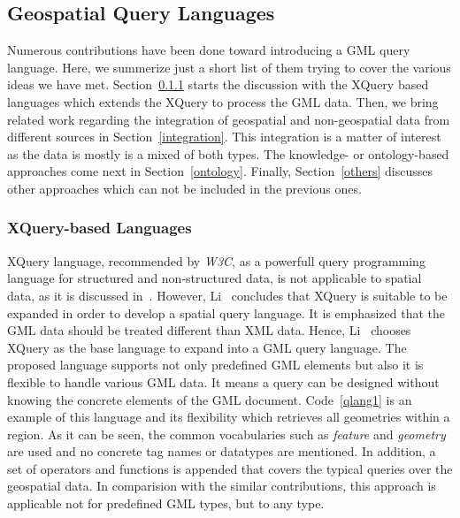 \documentclass[a4paper,12pt]{article}
\begin{document}
\subsection{Geospatial Query Languages}
\label{queryLang}
Numerous contributions have been done toward introducing a GML query language.
Here, we summerize just a short list of them trying to cover the various ideas we have met. %
Section~\ref{xquery-based} starts the discussion with the XQuery based languages which extends the XQuery
to process the GML data.
Then, we bring related work regarding the integration of geospatial and non-geospatial
data from different sources in Section~\ref{integration}. This integration is a matter of interest
as the data is mostly is a mixed of both types. The knowledge- or ontology-based approaches 
come next in Section~\ref{ontology}.
Finally, Section~\ref{others} discusses other approaches which can not be included in the previous
ones.

\subsubsection{XQuery-based Languages}
\label{xquery-based}
XQuery language, recommended by \emph{W3C}, as a powerfull query programming language for structured and non-structured data, 
is not applicable to spatial data, as it is discussed in~\cite{Lisa2006,Chen2010}. 
However, Li~\cite{Lisa2006} concludes that XQuery is suitable to be expanded in order to develop a spatial query language.
It is emphasized that the GML data should be treated different than XML data. Hence, Li~\cite{Lisa2006} chooses XQuery as the base language to expand into a GML query language. The proposed language supports not only predefined GML elements but also it is flexible to handle various GML data. 
It means a query can be designed without knowing the concrete elements of the GML document.
Code~\ref{qlang1} is an example of this language and its flexibility
which retrieves all geometries within a region. As it can be seen, 
the common vocabularies such as \textit{feature} and \textit{geometry} are used and no concrete tag names or datatypes are mentioned.
In addition, a set of operators and functions is appended that covers the typical queries over the geospatial data. 
In comparision with the similar contributions, this approach is applicable not for predefined GML types, but to any type.

\vspace{10px}
\vspace{10px}
\end{document}
